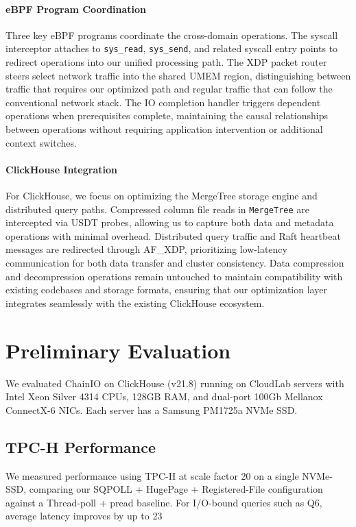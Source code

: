 \documentclass[sigconf,10pt]{acmart}
\newcommand{\sys}{ChainIO\xspace}
\begin{document}
\paragraph{eBPF Program Coordination}
Three key eBPF programs coordinate the cross-domain operations. The syscall interceptor attaches to \texttt{sys\_read}, \texttt{sys\_send}, and related syscall entry points to redirect operations into our unified processing path. The XDP packet router steers select network traffic into the shared UMEM region, distinguishing between traffic that requires our optimized path and regular traffic that can follow the conventional network stack. The IO completion handler triggers dependent operations when prerequisites complete, maintaining the causal relationships between operations without requiring application intervention or additional context switches.

\paragraph{ClickHouse Integration}
For ClickHouse, we focus on optimizing the MergeTree storage engine and distributed query paths. Compressed column file reads in \texttt{MergeTree} are intercepted via USDT probes, allowing us to capture both data and metadata operations with minimal overhead. Distributed query traffic and Raft heartbeat messages are redirected through AF\_XDP, prioritizing low-latency communication for both data transfer and cluster consistency. Data compression and decompression operations remain untouched to maintain compatibility with existing codebases and storage formats, ensuring that our optimization layer integrates seamlessly with the existing ClickHouse ecosystem.

\section{Preliminary Evaluation}\label{sec:evaluation}

We evaluated \sys on ClickHouse (v21.8) running on CloudLab servers with Intel Xeon Silver 4314 CPUs, 128GB RAM, and dual-port 100Gb Mellanox ConnectX-6 NICs. Each server has a Samsung PM1725a NVMe SSD.

\subsection{TPC-H Performance}

We measured performance using TPC-H at scale factor 20 on a single NVMe-SSD, comparing our SQPOLL + HugePage + Registered-File configuration against a Thread-poll + pread baseline. For I/O-bound queries such as Q6, average latency improves by up to 23%
\end{document}
